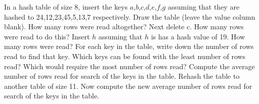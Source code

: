   In a hash table of size 8, insert the keys
  $a$,$b$,$c$,$d$,$e$,$f$,$g$
  assuming that they are hashed to
  24,12,23,45,5,13,7 respectively.
  Draw the table (leave the value column blank).
  How many rows were read altogether?
  Next delete c. How many rows were read to do this?
  Insert $h$ assuming that $h$ is has a hash value of 19.
  How many rows were
  read?
  For each key in the table,
  write down the number of rows read to find
  that key.
  Which keys can be found with the least number of
  rows read?
  Which would require the most number of rows read?
  Compute the average number of rows read for search of the keys in the table.
  Rehash the table to another table of size 11.
  Now compute the new
  average number of rows read for search of the keys in the table.
